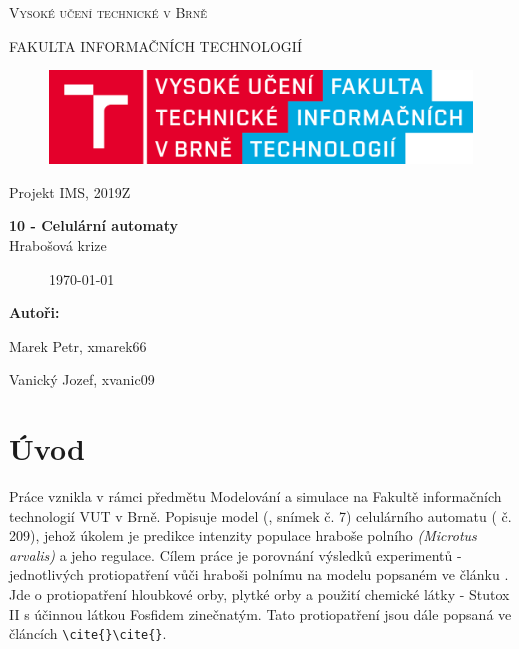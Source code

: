 \documentclass[a4paper,11pt]{article}
\begin{document}

\begin{titlepage}
\begin{center}
    {\Huge \textsc{Vysoké učení technické v Brně}}
    
    {\LARGE \uppercase{FAKULTA INFORMAČNÍCH TECHNOLOGIÍ}}
    
\begin{figure}[h]
\vspace{5.0cm}
\centering
\includegraphics[scale=0.15]{logo.png}
\vspace{-10.0cm}
\end{figure}
    
	{\LARGE Projekt IMS, 2019Z}

	{\Huge \textbf{10 - Celulární automaty}}
\\

{\LARGE {Hrabošová krize}}\\

\begin{figure}[h]
\centering
{\Large {\mydate\today}}
\vspace{6cm}
\end{figure}

\end{center}
\begin{compactitem}
\item[] \textbf{Autoři:}
\item[] Marek Petr, xmarek66
\item[] Vanický Jozef, xvanic09
\end{compactitem}

\end{titlepage}

\tableofcontents
\newpage

\section{Úvod}
Práce vznikla v rámci předmětu Modelování a simulace na Fakultě informačních technologií VUT v Brně. Popisuje model (\cite{slajdy}, snímek č. 7) celulárního automatu (\cite{slajdy} č. 209), jehož úkolem je predikce intenzity populace hraboše polního \textit{(Microtus arvalis)} a jeho regulace. Cílem práce je porovnání výsledků experimentů - jednotlivých protiopatření vůči hraboši polnímu na modelu popsaném ve článku \cite{OurCA}. Jde o protiopatření hloubkové orby, plytké orby a použití chemické látky - Stutox II s účinnou látkou Fosfidem zinečnatým. Tato protiopatření jsou dále popsaná ve článcích \verb|\cite{}|\verb|\cite{}|. 
\end{document}
